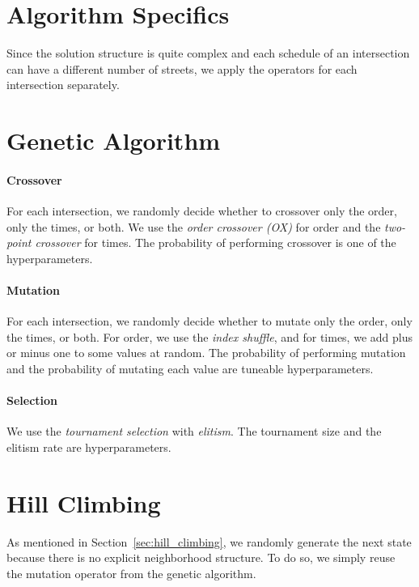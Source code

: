 \section{Algorithm Specifics }

Since the solution structure is quite complex and each schedule of an intersection can have a different number of streets, we apply the operators for each intersection separately.

\section{Genetic Algorithm}

\paragraph{Crossover}

For each intersection, we randomly decide whether to crossover only the order, only the times, or both. We use the \textit{order crossover (OX)} for order and the \textit{two-point crossover} for times. The probability of performing crossover is one of the hyperparameters.

\paragraph{Mutation}

For each intersection, we randomly decide whether to mutate only the order, only the times, or both. For order, we use the \textit{index shuffle}, and for times, we add plus or minus one to some values at random. The probability of performing mutation and the probability of mutating each value are tuneable hyperparameters.

\paragraph{Selection}

We use the \textit{tournament selection} with \textit{elitism}. The tournament size and the elitism rate are hyperparameters.

\section{Hill Climbing}

As mentioned in Section~\ref{sec:hill_climbing}, we randomly generate the next state because there is no explicit neighborhood structure. To do so, we simply reuse the mutation operator from the genetic algorithm.

